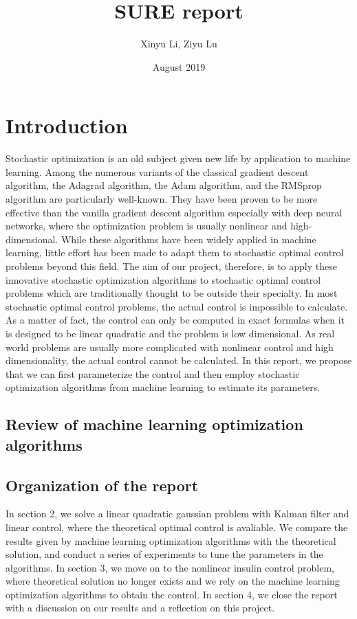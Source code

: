 \documentclass{article}
\title{SURE report}
\author{Xinyu Li, Ziyu Lu}
\date{August 2019}
\begin{document}
\maketitle

\section{Introduction} 
Stochastic optimization is an old subject given new life by application to machine learning. Among the numerous variants of the classical gradient descent algorithm, the Adagrad algorithm\cite{duchi2011adaptive}, the Adam algorithm\cite{kingma2014adam}, and the RMSprop algorithm\cite{tieleman2012lecture} are particularly well-known. They have been proven to be more effective than the vanilla gradient descent algorithm especially with deep neural networks, where the optimization problem is usually nonlinear and high-dimensional. While these algorithms have been widely applied in machine learning, little effort has been made to adapt them to stochastic optimal control problems beyond this field. The aim of our project, therefore, is to apply these innovative stochastic optimization algorithms to stochastic optimal control problems which are traditionally thought to be outside their specialty. In most stochastic optimal control problems, the actual control is impossible to calculate. As a matter of fact, the control can only be computed in exact formulas when it is designed to be linear quadratic and the problem is low dimensional. As real world problems are usually more complicated with nonlinear control and high dimensionality, the actual control cannot be calculated. In this report, we propose that we can first parameterize the control and then employ stochastic optimization algorithms from machine learning to estimate its parameters.

\subsection{Review of machine learning optimization algorithms}


\subsection{Organization of the report}
In section 2, we solve a linear quadratic gaussian problem with Kalman filter and linear control, where the theoretical optimal control is avaliable. We compare the results given by machine learning optimization algorithms with the theoretical solution, and conduct a series of experiments to tune the parameters in the algorithms. In section 3, we move on to the nonlinear insulin control problem, where theoretical solution no longer exists and we rely on the machine learning optimization algorithms to obtain the control. In section 4, we close the report with a discussion on our results and a reflection on this project.
\end{document}
